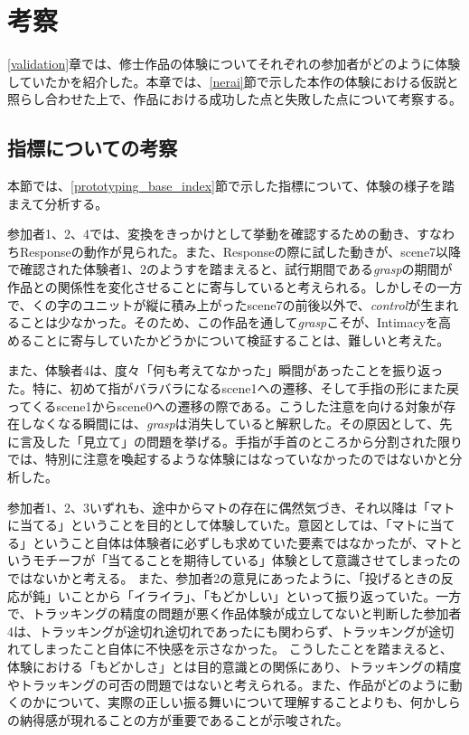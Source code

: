 \chapter{考察}
\label{考察}
\ref{validation}章では、修士作品の体験についてそれぞれの参加者がどのように体験していたかを紹介した。本章では、\ref{nerai}節で示した本作の体験における仮説と照らし合わせた上で、作品における成功した点と失敗した点について考察する。

\section{指標についての考察}
本節では、\ref{prototyping_base_index}節で示した指標について、体験の様子を踏まえて分析する。

参加者1、2、4では、変換をきっかけとして挙動を確認するための動き、すなわちResponseの動作が見られた。また、Responseの際に試した動きが、scene7以降で確認された体験者1、2のようすを踏まえると、試行期間である\textit{grasp}の期間が作品との関係性を変化させることに寄与していると考えられる。しかしその一方で、くの字のユニットが縦に積み上がったscene7の前後以外で、\textit{control}が生まれることは少なかった。そのため、この作品を通して\textit{grasp}こそが、Intimacyを高めることに寄与していたかどうかについて検証することは、難しいと考えた。


また、体験者4は、度々「何も考えてなかった」瞬間があったことを振り返った。特に、初めて指がバラバラになるscene1への遷移、そして手指の形にまた戻ってくるscene1からscene0への遷移の際である。こうした注意を向ける対象が存在しなくなる瞬間には、\textit{grasp}は消失していると解釈した。その原因として、先に言及した「見立て」の問題を挙げる。手指が手首のところから分割された限りでは、特別に注意を喚起するような体験にはなっていなかったのではないかと分析した。

参加者1、2、3いずれも、途中からマトの存在に偶然気づき、それ以降は「マトに当てる」ということを目的として体験していた。意図としては、「マトに当てる」ということ自体は体験者に必ずしも求めていた要素ではなかったが、マトというモチーフが「当てることを期待している」体験として意識させてしまったのではないかと考える。
また、参加者2の意見にあったように、「投げるときの反応が鈍」いことから「イライラ」、「もどかしい」といって振り返っていた。一方で、トラッキングの精度の問題が悪く作品体験が成立してないと判断した参加者4は、トラッキングが途切れ途切れであったにも関わらず、トラッキングが途切れてしまったこと自体に不快感を示さなかった。
こうしたことを踏まえると、体験における「もどかしさ」とは目的意識との関係にあり、トラッキングの精度やトラッキングの可否の問題ではないと考えられる。また、作品がどのように動くのかについて、実際の正しい振る舞いについて理解することよりも、何かしらの納得感が現れることの方が重要であることが示唆された。

